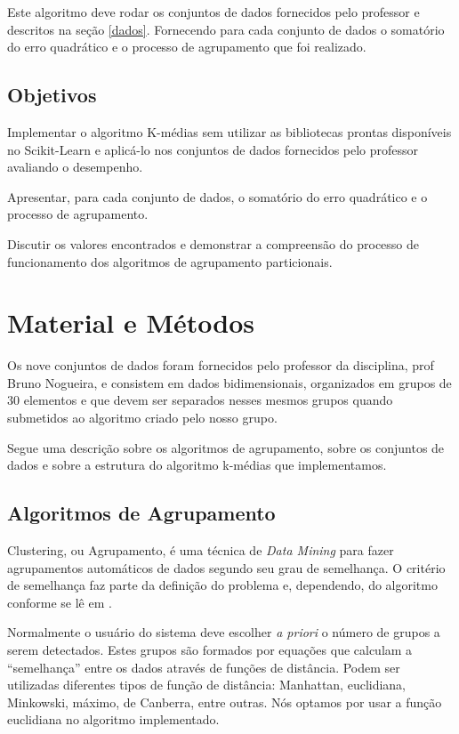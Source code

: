 \documentclass[12pt, a4paper]{article}
\begin{document}
Este algoritmo deve rodar os conjuntos de dados fornecidos pelo professor e descritos na seção \ref{dados}. Fornecendo para cada conjunto de dados o somatório do erro quadrático e o processo de agrupamento que foi realizado.

\subsection{Objetivos}
Implementar o algoritmo K-médias sem utilizar as bibliotecas prontas disponíveis no Scikit-Learn \citep{scikit-learn} e aplicá-lo nos conjuntos de dados fornecidos pelo professor avaliando o desempenho.

Apresentar, para cada conjunto de dados, o somatório do erro quadrático e o processo de agrupamento.

Discutir os valores encontrados e demonstrar a compreensão do processo de funcionamento dos algoritmos de agrupamento particionais.

\section{Material e Métodos}
Os nove conjuntos de dados foram fornecidos pelo professor da disciplina, prof Bruno Nogueira, e consistem em dados bidimensionais, organizados em grupos de 30 elementos e que devem ser separados nesses mesmos grupos quando submetidos ao algoritmo criado pelo nosso grupo.

Segue uma descrição sobre os algoritmos de agrupamento, sobre os conjuntos de dados e sobre a estrutura do algoritmo k-médias que implementamos.

\subsection{Algoritmos de Agrupamento}
\label{algoritmos}
Clustering, ou Agrupamento,  é uma técnica de \textit{Data Mining} para fazer agrupamentos automáticos de dados segundo seu grau de semelhança. O critério de semelhança faz parte da definição do problema e, dependendo, do algoritmo conforme se lê em \citep{clustering}.

Normalmente o usuário do sistema deve escolher \textit{a priori} o número de grupos a serem detectados. Estes grupos são formados por equações que calculam a ``semelhança'' entre os dados através de funções de distância. Podem ser utilizadas diferentes tipos de função de distância: Manhattan, euclidiana, Minkowski, máximo, de Canberra, entre outras. Nós optamos por usar a função euclidiana no algoritmo implementado.
\end{document}
